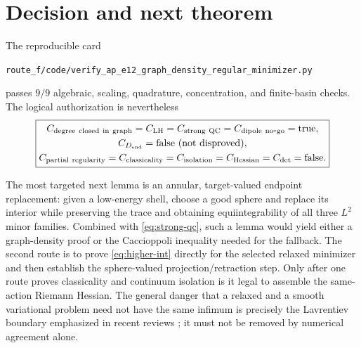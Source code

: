 \documentclass[11pt]{article}
\begin{document}
\section{Decision and next theorem}

The reproducible card
\begin{center}
\texttt{route\_f/code/verify\_ap\_e12\_graph\_density\_regular\_minimizer.py}
\end{center}
passes $9/9$ algebraic, scaling, quadrature, concentration, and finite-basin
checks.  The logical authorization is nevertheless
\begin{equation}
 \boxed{\begin{gathered}
 C_{\rm degree\ closed\ in\ graph}=C_{\rm LH}
 =C_{\rm strong\ QC}=C_{\rm dipole\ no\mbox{-}go}=\mathrm{true},\\
 C_{D_{\rm end}}=\mathrm{false\ (not\ disproved)},\\
 C_{\rm partial\ regularity}=C_{\rm classicality}=C_{\rm isolation}
 =C_{\rm Hessian}=C_{\det}=\mathrm{false}.
 \end{gathered}}
 \label{eq:decision}
\end{equation}

The most targeted next lemma is an annular, target-valued endpoint replacement:
given a low-energy shell, choose a good sphere and replace its interior while
preserving the trace and obtaining equiintegrability of all three $L^2$ minor
families.  Combined with \eqref{eq:strong-qc}, such a lemma would yield either
a graph-density proof or the Caccioppoli inequality needed for the fallback.
The second route is to prove \eqref{eq:higher-int} directly for the selected
relaxed minimizer and then establish the sphere-valued projection/retraction
step.  Only after one route proves classicality and continuum isolation is it
legal to assemble the same-action Riemann Hessian.  The general danger that a
relaxed and a smooth variational problem need not have the same infimum is
precisely the Lavrentiev boundary emphasized in recent reviews
\cite{CerfMariconda2024}; it must not be removed by numerical agreement alone.



\end{document}
